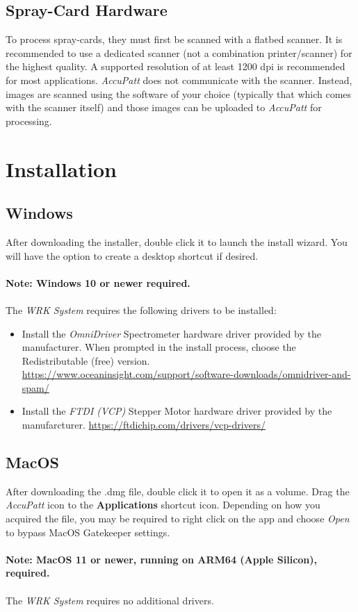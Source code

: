 \documentclass[10pt,letterpaper,titlepage]{article}
\begin{document}
    \subsection{Spray-Card Hardware}
    To process spray-cards, they must first be scanned with a flatbed scanner. It is recommended to use a dedicated scanner (not a combination printer/scanner) for the highest quality. A supported resolution of at least 1200 dpi is recommended for most applications. \textit{AccuPatt} does not communicate with the scanner. Instead, images are scanned using the software of your choice (typically that which comes with the scanner itself) and those images can be uploaded to \textit{AccuPatt} for processing.
    
    \newpage

    \section{Installation}

    \subsection{Windows}
    After downloading the installer, double click it to launch the install wizard. You will have the option to create a desktop shortcut if desired.\\
    \\\textbf{\color{red}Note: Windows 10 or newer required.\color{black}}\\\\
    The \textit{WRK System} requires the following drivers to be installed:
    \begin{itemize}
        \item Install the \textit{OmniDriver} Spectrometer hardware driver provided by the manufacturer. When prompted in the install process, choose the Redistributable (free) version. \url{https://www.oceaninsight.com/support/software-downloads/omnidriver-and-spam/}
        \item Install the \textit{FTDI (VCP)} Stepper Motor hardware driver provided by the manufarcturer. \url{https://ftdichip.com/drivers/vcp-drivers/}
    \end{itemize}
    \subsection{MacOS}
    After downloading the .dmg file, double click it to open it as a volume. Drag the \textit{AccuPatt} icon to the \textbf{Applications} shortcut icon. Depending on how you acquired the file, you may be required to right click on the app and choose \textit{Open} to bypass MacOS Gatekeeper settings.\\ 
    \\\textbf{\color{red}Note: MacOS 11 or newer, running on ARM64 (Apple Silicon), required.\color{black}}\\\\
    The \textit{WRK System} requires no additional drivers.
    \newpage
\end{document}
